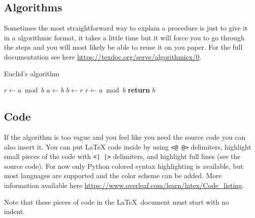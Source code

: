 \documentclass{project-logbook}
\begin{document}
	\subsection{Algorithms} \label{sub:algorithms}

		\begin{HighlightedNote}{}
			Sometimes the most straightforward way to explain a procedure is just to give it in a algorithmic format, it takes a little time but it will force you to go through the steps and you will most likely be able to reuse it on you paper. For the full documentation see here \url{https://texdoc.org/serve/algorithmicx/0}.
		\end{HighlightedNote}

		\begin{algorithm}
			\caption{Euclid’s algorithm}\label{alg:euclid}
			\begin{algorithmic}[1]
					\State $r\gets a\bmod b$
						\State $a\gets b$
						\State $b\gets r$
						\State $r\gets a\bmod b$
					\EndWhile\label{euclidendwhile}
					\State \textbf{return} $b$
				\EndProcedure
			\end{algorithmic}
		\end{algorithm}


	\subsection{Code} \label{sub:code}
		\begin{HighlightedNote}{}
			If the algorithm is too vague and you feel like you need the source code you can also insert it. You can put LaTeX code inside by using \texttt{<@ @>} delimiters, highlight small pieces of the code with \texttt{<| |>} delimiters, and highlight full lines (see the source code). For now only Python colored syntax highlighting is available, but most languages are supported and the color scheme can be added. More information available here \url{https://www.overleaf.com/learn/latex/Code_listing}.

			Note that these pieces of code in the \LaTeX~document must start with no indent.
		\end{HighlightedNote}
\end{document}
